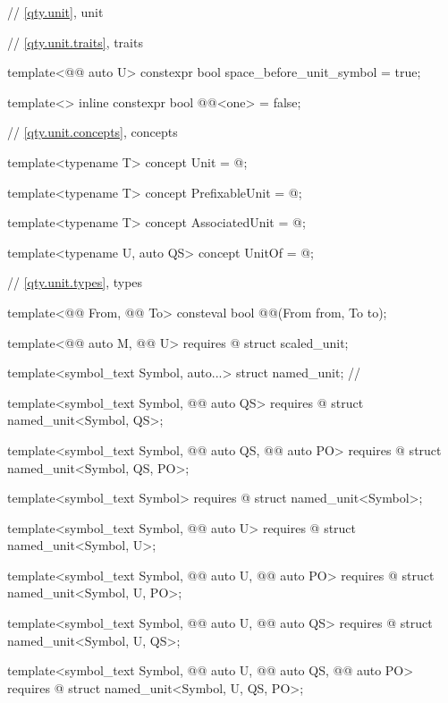 \begin{codeblock}
{// \ref{qty.unit}, unit

// \ref{qty.unit.traits}, traits

template<@@ auto U>
constexpr bool space_before_unit_symbol = true;

template<>
inline constexpr bool @@<one> = false;

// \ref{qty.unit.concepts}, concepts

template<typename T>
concept Unit = @\seebelownc@;

template<typename T>
concept PrefixableUnit = @\seebelownc@;

template<typename T>
concept AssociatedUnit = @\seebelownc@;

template<typename U, auto QS>
concept UnitOf = @\seebelownc@;

// \ref{qty.unit.types}, types

template<@@ From, @@ To>
consteval bool @@(From from, To to);

template<@@ auto M, @@ U>
  requires @\seebelownc@
struct scaled_unit;

template<symbol_text Symbol, auto...>
struct named_unit;  // \notdef

template<symbol_text Symbol, @@ auto QS>
  requires @\seebelownc@
struct named_unit<Symbol, QS>;

template<symbol_text Symbol, @@ auto QS, @@ auto PO>
  requires @\seebelownc@
struct named_unit<Symbol, QS, PO>;

template<symbol_text Symbol>
  requires @\seebelownc@
struct named_unit<Symbol>;

template<symbol_text Symbol, @@ auto U>
  requires @\seebelownc@
struct named_unit<Symbol, U>;

template<symbol_text Symbol, @@ auto U, @@ auto PO>
  requires @\seebelownc@
struct named_unit<Symbol, U, PO>;

template<symbol_text Symbol, @@ auto U, @@ auto QS>
  requires @\seebelownc@
struct named_unit<Symbol, U, QS>;

template<symbol_text Symbol, @@ auto U, @@ auto QS,
         @@ auto PO>
  requires @\seebelownc@
struct named_unit<Symbol, U, QS, PO>;

}
\end{codeblock}
